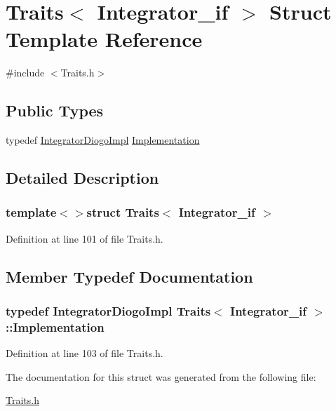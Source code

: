 \hypertarget{struct_traits_3_01_integrator__if_01_4}{\section{Traits$<$ Integrator\-\_\-if $>$ Struct Template Reference}
\label{struct_traits_3_01_integrator__if_01_4}
}


{\ttfamily \#include $<$Traits.\-h$>$}

\subsection*{Public Types}
\begin{DoxyCompactItemize}
\item 
typedef \hyperlink{class_integrator_diogo_impl}{Integrator\-Diogo\-Impl} \hyperlink{struct_traits_3_01_integrator__if_01_4_a769086471264fef36503be109ded8b33}{Implementation}
\end{DoxyCompactItemize}


\subsection{Detailed Description}
\subsubsection*{template$<$$>$struct Traits$<$ Integrator\-\_\-if $>$}



Definition at line 101 of file Traits.\-h.



\subsection{Member Typedef Documentation}
\hypertarget{struct_traits_3_01_integrator__if_01_4_a769086471264fef36503be109ded8b33}{
\subsubsection[{Implementation}]{\setlength{\rightskip}{0pt plus 5cm}typedef {\bf Integrator\-Diogo\-Impl} {\bf Traits}$<$ {\bf Integrator\-\_\-if} $>$\-::{\bf Implementation}}}\label{struct_traits_3_01_integrator__if_01_4_a769086471264fef36503be109ded8b33}


Definition at line 103 of file Traits.\-h.



The documentation for this struct was generated from the following file\-:\begin{DoxyCompactItemize}
\item 
\hyperlink{_traits_8h}{Traits.\-h}\end{DoxyCompactItemize}
